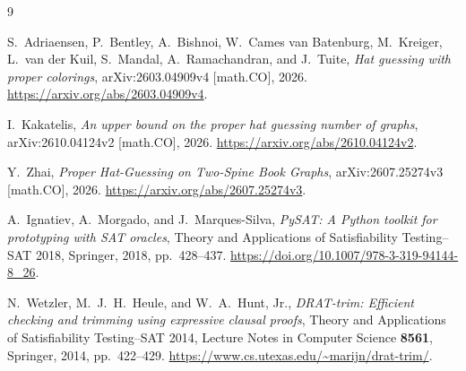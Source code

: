 \begin{thebibliography}{9}

S.~Adriaensen, P.~Bentley, A.~Bishnoi, W.~Cames van Batenburg,
M.~Kreiger, L.~van der Kuil, S.~Mandal, A.~Ramachandran, and J.~Tuite,
\emph{Hat guessing with proper colorings},
arXiv:2603.04909v4 [math.CO], 2026.
\url{https://arxiv.org/abs/2603.04909v4}.

I.~Kakatelis,
\emph{An upper bound on the proper hat guessing number of graphs},
arXiv:2610.04124v2 [math.CO], 2026.
\url{https://arxiv.org/abs/2610.04124v2}.

Y.~Zhai,
\emph{Proper Hat-Guessing on Two-Spine Book Graphs},
arXiv:2607.25274v3 [math.CO], 2026.
\url{https://arxiv.org/abs/2607.25274v3}.

A.~Ignatiev, A.~Morgado, and J.~Marques-Silva,
\emph{PySAT: A Python toolkit for prototyping with SAT oracles},
Theory and Applications of Satisfiability Testing--SAT 2018,
Springer, 2018,
pp.~428--437.
\url{https://doi.org/10.1007/978-3-319-94144-8_26}.

N.~Wetzler, M.~J.~H.~Heule, and W.~A.~Hunt, Jr.,
\emph{DRAT-trim: Efficient checking and trimming using expressive clausal proofs},
Theory and Applications of Satisfiability Testing--SAT 2014,
Lecture Notes in Computer Science \textbf{8561}, Springer, 2014,
pp.~422--429.
\url{https://www.cs.utexas.edu/~marijn/drat-trim/}.

\end{thebibliography}
